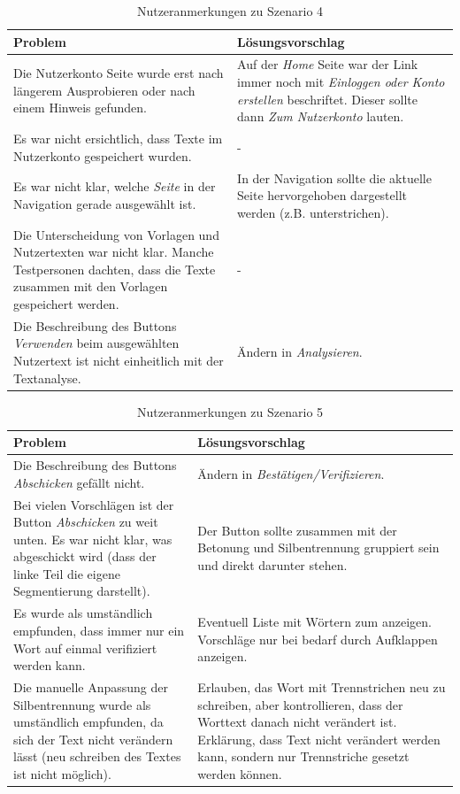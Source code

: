 \begin{table}[h!]
	\centering
	\begin{tabular}{|p{}|p{}|}
		\hline
		\textbf{Problem} & \textbf{Lösungsvorschlag}\\
		\hline
		\hline
		Die Nutzerkonto Seite wurde erst nach längerem Ausprobieren oder nach einem Hinweis gefunden. & Auf der \textit{Home} Seite war der Link immer noch mit \textit{Einloggen oder Konto erstellen} beschriftet. Dieser sollte dann \textit{Zum Nutzerkonto} lauten.\\
		\hline
		Es war nicht ersichtlich, dass Texte im Nutzerkonto gespeichert wurden. & -\\
		\hline
		Es war nicht klar, welche \textit{Seite} in der Navigation gerade ausgewählt ist. & In der Navigation sollte die aktuelle Seite hervorgehoben dargestellt werden (z.B. unterstrichen).\\
		\hline
		Die Unterscheidung von Vorlagen und Nutzertexten war nicht klar. Manche Testpersonen dachten, dass die Texte zusammen mit den Vorlagen gespeichert werden. & -\\
		\hline
		Die Beschreibung des Buttons \textit{Verwenden} beim ausgewählten Nutzertext ist nicht einheitlich mit der Textanalyse. & Ändern in \textit{Analysieren}.\\
		\hline
	\end{tabular}
	\caption{Nutzeranmerkungen zu Szenario 4}
	\label{table:szenario4}
\end{table}


\begin{table}[h!]
	\centering
	\begin{tabular}{|p{}|p{}|}
		\hline
		\textbf{Problem} & \textbf{Lösungsvorschlag}\\
		\hline
		\hline
		Die Beschreibung des Buttons \textit{Abschicken} gefällt nicht. & Ändern in \textit{Bestätigen/Verifizieren}.\\
		\hline
		Bei vielen Vorschlägen ist der Button \textit{Abschicken} zu weit unten. Es war nicht klar, was abgeschickt wird (dass der linke Teil die eigene Segmentierung darstellt). & Der Button sollte zusammen mit der Betonung und Silbentrennung gruppiert sein und direkt darunter stehen.\\
		\hline
		Es wurde als umständlich empfunden, dass immer nur ein Wort auf einmal verifiziert werden kann. & Eventuell Liste mit Wörtern zum \qq{Abhaken} anzeigen. Vorschläge nur bei bedarf durch Aufklappen anzeigen.\\
		\hline
		Die manuelle Anpassung der Silbentrennung wurde als umständlich empfunden, da sich der Text nicht verändern lässt (neu schreiben des Textes ist nicht möglich). & Erlauben, das Wort mit Trennstrichen neu zu schreiben, aber kontrollieren, dass der Worttext danach nicht verändert ist.
		Erklärung, dass Text nicht verändert werden kann, sondern nur Trennstriche gesetzt werden können.\\
		\hline
	\end{tabular}
	\caption{Nutzeranmerkungen zu Szenario 5}
	\label{table:szenario5}
\end{table}